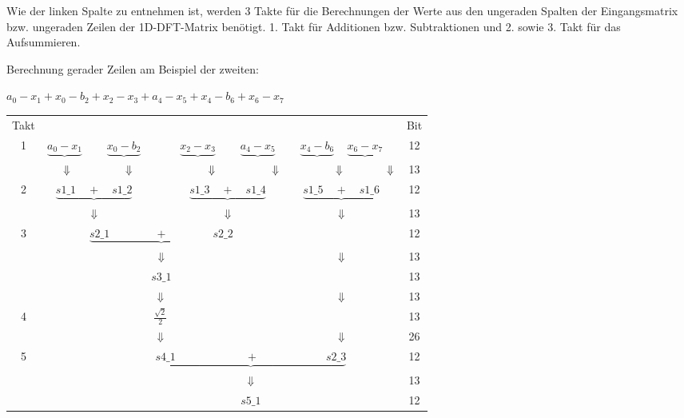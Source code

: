\vspace{0.5cm}

Wie der linken Spalte zu entnehmen ist, werden 3 Takte für die Berechnungen der Werte aus den ungeraden Spalten der Eingangsmatrix bzw. ungeraden Zeilen der 1D-DFT-Matrix benötigt.
1. Takt für Additionen bzw. Subtraktionen und 2. sowie 3. Takt für das Aufsummieren.
\vspace{1cm}

Berechnung gerader Zeilen am Beispiel der zweiten:
 \begin{center} 
 $a_0 - x_1 + x_0 - b_2 + x_2 - x_3 + a_4 - x_5 + x_4 - b_6 + x_6 - x_7$\\
 \end{center}
 
 \vspace{0.3cm}

\begin{tabular}{ccccccccccccc}
Takt&\multicolumn{11}{c}{}&Bit\\
1 &$\underbrace{a_0 - x_1}$ &        &$ \underbrace{x_0 - b_2}$ &  &$\underbrace{x_2 - x_3}$ &  &$\underbrace{a_4 - x_5}$ &  &$\underbrace{x_4 - b_6}$ &$\underbrace{x_6 - x_7}$& &12\\
  &\multicolumn{11}{l}{$\hspace{0.5cm} \Downarrow \hspace{1.75cm} \Downarrow \hspace{2.4cm} \Downarrow \hspace{1.8cm}\Downarrow \hspace{1.8cm}\Downarrow \hspace{1.4cm}\Downarrow$}&13\\
2 &\multicolumn{3}{c}{$\underbrace{s1\_1 \quad + \quad s1\_2}$} & & \multicolumn{3}{c}{$\underbrace{s1\_3 \quad + \quad s1\_4}$} &\multicolumn{3}{c}{$\quad \underbrace{s1\_5 \quad + \quad s1\_6}$}& &12\\
  &\multicolumn{3}{c}{$\Downarrow$}  & & \multicolumn{3}{c}{$\Downarrow$} & & \multicolumn{2}{c}{$\Downarrow$}& &13\\
3 &\multicolumn{7}{c}{$\underbrace{s2\_1 \quad  \quad \quad \quad + \quad \quad \quad  \quad s2\_2}$} & & & & &12\\
  &\multicolumn{7}{c}{$\Downarrow$}& & \multicolumn{2}{c}{$\Downarrow$}& &13\\
  &\multicolumn{7}{c}{$s3\_1$}& & & & &13\\
  & & & & $\Downarrow$& & & & & \multicolumn{2}{c}{$\Downarrow$} & & 13\\
4 & & & & $\frac{\sqrt{2}}{2}$&\multicolumn{5}{c}{}& & &13\\
  & & & & $\Downarrow$& & & & & \multicolumn{2}{c}{$\Downarrow$ }& & 26\\
5 & & & \multicolumn{9}{c}{$\underbrace{s4\_1 \:  \quad \quad \quad \quad \quad \quad + \quad \quad \quad \quad \quad \quad   s2\_3}$} &12\\
  & & & \multicolumn{9}{c}{$\Downarrow$}&13\\
  & & & \multicolumn{9}{c}{$s5\_1$}&12\\
\end{tabular}

